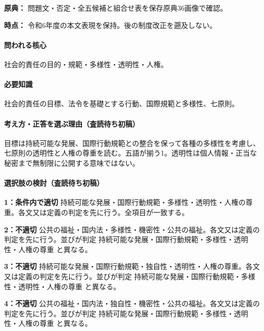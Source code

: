 \noindent\textbf{原典：} 問題文・否定・全五候補と組合せ表を保存原典36画像で確認。\par

\noindent\textbf{時点：} 令和6年度の本文表現を保持。後の制度改正を遡及しない。\par

\paragraph{問われる核心} 社会的責任の目的・規範・多様性・透明性・人権。

\paragraph{必要知識} 社会的責任の目標、法令を基礎とする行動、国際規範と多様性、七原則。

\paragraph{考え方・正答を選ぶ理由（査読待ち初稿）} 目標は持続可能な発展、国際行動規範との整合を保って各種の多様性を考慮し、七原則の透明性と人権の尊重を読む。五語が揃う1。透明性は個人情報・正当な秘密まで無制限に公開する意味ではない。

\paragraph{選択肢の検討（査読待ち初稿）}\mbox{}\par

\noindent\textbf{1：条件内で適切} 持続可能な発展・国際行動規範・多様性・透明性・人権の尊重。各文又は定義の判定を先に行う。全項目が一致する。\par

\noindent\textbf{2：不適切} 公共の福祉・国内法・多様性・機密性・公共の福祉。各文又は定義の判定を先に行う。並びが判定 持続可能な発展・国際行動規範・多様性・透明性・人権の尊重 と異なる。\par

\noindent\textbf{3：不適切} 持続可能な発展・国際行動規範・独自性・透明性・人権の尊重。各文又は定義の判定を先に行う。並びが判定 持続可能な発展・国際行動規範・多様性・透明性・人権の尊重 と異なる。\par

\noindent\textbf{4：不適切} 公共の福祉・国内法・独自性・機密性・公共の福祉。各文又は定義の判定を先に行う。並びが判定 持続可能な発展・国際行動規範・多様性・透明性・人権の尊重 と異なる。\par

